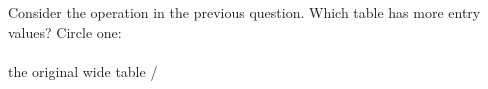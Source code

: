 \documentclass[12pt]{article}
\begin{document}
 Consider the operation in the previous question. Which table has more entry values? Circle one: \\
~\\
the original wide table / 






%



\end{document}
